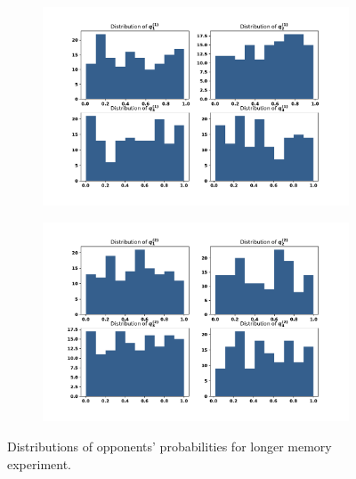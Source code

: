 \begin{figure}[!htbp]
    \begin{subfigure}{0.5\textwidth}
        \centering
        \includegraphics[width=\linewidth]{src/chapters/05/paper/memory-size-in-the-prisoners-dilemma/img/first_opponent_probabilities_with_gambler.pdf}
        \label{fig:first_opponents_probabilities_with_gambler}
    \end{subfigure}
    \begin{subfigure}{0.5\textwidth}
        \centering
        \includegraphics[width=\linewidth]{src/chapters/05/paper/memory-size-in-the-prisoners-dilemma/img/second_opponent_probabilities_with_gambler.pdf}
        \label{fig:second_opponents_probabilities_with_gambler}
    \end{subfigure}
    \caption{Distributions of opponents' probabilities for longer memory experiment.}
\end{figure}

